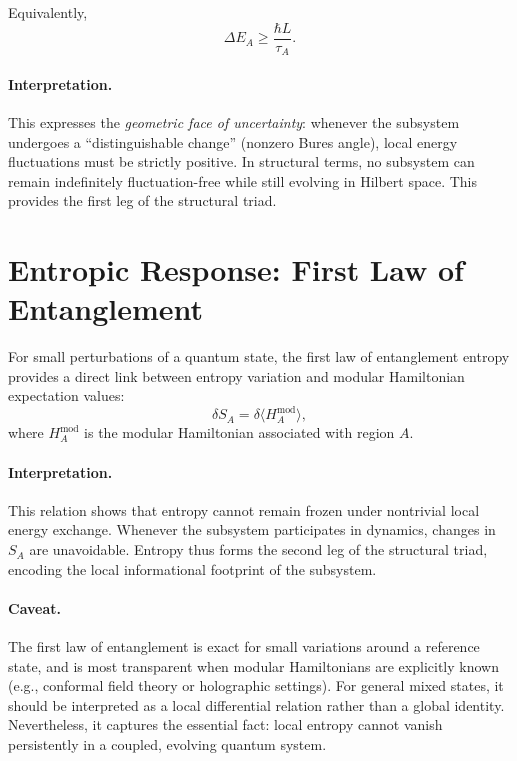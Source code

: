 \documentclass[10pt]{article}
\begin{document}
Equivalently,
\begin{equation}
\Delta E_A \geq \frac{\hbar L}{\tau_A}.
\end{equation}

\paragraph{Interpretation.}
This expresses the \emph{geometric face of uncertainty}: whenever the subsystem undergoes a
``distinguishable change'' (nonzero Bures angle), local energy fluctuations must be strictly positive.
In structural terms, no subsystem can remain indefinitely fluctuation-free while still evolving in
Hilbert space. This provides the first leg of the structural triad.
\section{Entropic Response: First Law of Entanglement}

For small perturbations of a quantum state, the first law of entanglement entropy provides a direct link
between entropy variation and modular Hamiltonian expectation values:
\begin{equation}
\delta S_A = \delta \langle H^{\mathrm{mod}}_A \rangle,
\end{equation}
where $H^{\mathrm{mod}}_A$ is the modular Hamiltonian associated with region $A$.

\paragraph{Interpretation.}
This relation shows that entropy cannot remain frozen under nontrivial local energy exchange.
Whenever the subsystem participates in dynamics, changes in $S_A$ are unavoidable. Entropy thus forms
the second leg of the structural triad, encoding the local informational footprint of the subsystem.

\paragraph{Caveat.}
The first law of entanglement is exact for small variations around a reference state, and is most
transparent when modular Hamiltonians are explicitly known (e.g., conformal field theory or holographic
settings). For general mixed states, it should be interpreted as a local differential relation rather than a
global identity. Nevertheless, it captures the essential fact: local entropy cannot vanish persistently in
a coupled, evolving quantum system.
\end{document}
